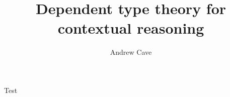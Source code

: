 \documentclass{article}
\author{Andrew Cave}
\title{Dependent type theory for contextual reasoning}
\begin{document}
\maketitle

Test
\end{document}
